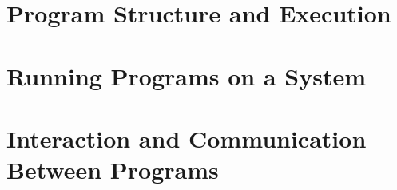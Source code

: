 \documentclass[11pt,fleqn]{book} %
\makeatletter
\renewcommand{\cleardoublepage}{
  \clearpage\ifodd\c@page\else
  \hbox{}
  \vspace*{\fill}
  \thispagestyle{empty}
  \newpage
  \fi}
\numberwithin{dummy}{section}
\theoremstyle{ocrenumbox}
\theoremstyle{blacknumexe}
\theoremstyle{blacknumexa}
\theoremstyle{blacknumessential}
\theoremstyle{blacknumpro}
\theoremstyle{blacknumbox}
\theoremstyle{blacknumbox}
\theoremstyle{ocrenum}
\makeatother
\begin{document}



\pagestyle{empty} %

\tableofcontents %

\cleardoublepage %

\pagestyle{fancy} %

\part{Program Structure and Execution}

% 
% 
% 
% 
% 
% 
% 

\part{Running Programs on a System}

% 
% 
% 
% 

\part{Interaction and Communication Between Programs}

% 
% 
% 
% 
% 
% 
% 
% 
% 
% 
% 
% 
% 
% 
\end{document}
